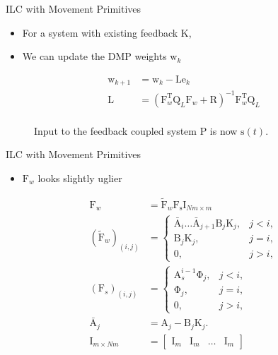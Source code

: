 \documentclass[handout]{beamer}
\newcommand{\boldvec}[1]{\boldsymbol{\mathrm{#1}}}
\let\vec\boldvec
\newcommand{\dmp}{\vec{s}} %
\newcommand{\error}{\vec{e}} %
\newcommand{\weights}{\vec{w}} %
\newcommand{\basis}{\vec{\Phi}} %
\newcommand{\lmatrix}{\vec{L}} %
\begin{document}
%
\begin{frame}{ILC with Movement Primitives}
\begin{itemize}
\item For a system with existing feedback $\vec{K}$,
\item We can update the DMP weights $\weights_k$ 
\end{itemize}
\begin{equation*}
\begin{aligned}
\weights_{k+1} &= \weights_{k} - \lmatrix\error_{k} \\
\lmatrix &= (\vec{F}_{w}^{\mathrm{T}}\vec{Q}_L\vec{F}_w + \vec{R})^{-1}\vec{F}_w^{\mathrm{T}}\vec{Q}_L \\
\end{aligned}
\end{equation*}
\begin{figure}
\centering
\def\svgwidth{200pt}

\caption{Input to the feedback coupled system $\vec{P}$ is now $\dmp(t)$.}
\end{figure}
\end{frame}
%
\begin{frame}{ILC with Movement Primitives}
\begin{itemize}
\item $\vec{F}_w$ looks slightly uglier
\end{itemize}
\begin{equation*}
\begin{aligned}
\vec{F}_{w} &= \tilde{\vec{F}}_{w}\vec{F}_{\dmp}\vec{I}_{Nm \times m} \\
(\tilde{\vec{F}}_{w})_{(i,j)} &= \left \{
\begin{array}{cc}
\bar{\vec{A}}_{i}\ldots \bar{\vec{A}}_{j+1}\vec{B}_{j}\vec{K}_{j}, & j < i, \\ 
\vec{B}_{j}\vec{K}_{j}, & j = i, \\
\vec{0}, & j > i,  
\end{array} \right. \\
(\vec{F}_{s})_{(i,j)} &= \left \{
\begin{array}{cc}
\vec{A}_s^{i-1}\basis_{j}, & j < i, \\ 
\basis_{j}, & j = i, \\
\vec{0}, & j > i,  
\end{array} \right. \\
\bar{\vec{A}}_j &= \vec{A}_j - \vec{B}_j\vec{K}_j. \\
\vec{I}_{m\times Nm} &= \begin{bmatrix}
  \vec{I}_{m} & \vec{I}_{m} & \ldots & \vec{I}_{m}
 \end{bmatrix}
\end{aligned}
\end{equation*}

\end{frame}
%
\end{document}
